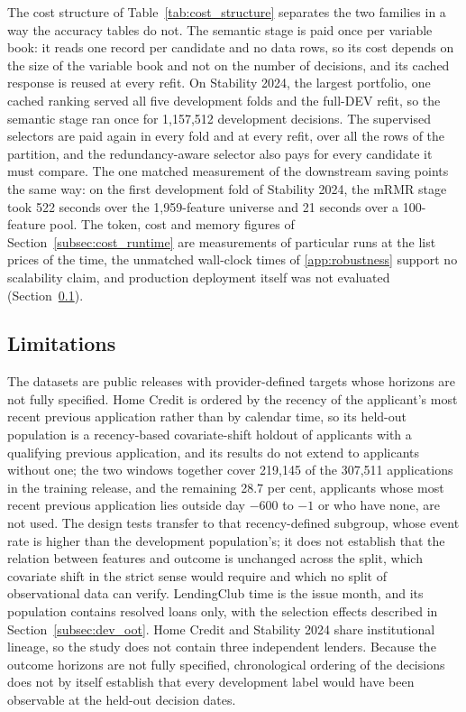 \documentclass[final,5p,twocolumn]{elsarticle}
\providecommand{\DIFaddtex}[1]{{\protect\color{blue} \sf #1}} %
\providecommand{\DIFaddend}{} %
\providecommand{\DIFadd}[1]{\texorpdfstring{\DIFaddtex{#1}}{#1}} %
\begin{document}
\DIFadd{The cost structure of Table~\ref{tab:cost_structure} separates the two families in a way the accuracy tables do not. The semantic stage is paid once per variable book: it reads one record per candidate and no data rows, so its cost depends on the size of the variable book and not on the number of decisions, and its cached response is reused at every refit. On Stability 2024, the largest portfolio, one cached ranking served all five development folds and the full-DEV refit, so the semantic stage ran once for 1,157,512 development decisions. The supervised selectors are paid again in every fold and at every refit, over all the rows of the partition, and the redundancy-aware selector also pays for every candidate it must compare. The one matched measurement of the downstream saving points the same way: on the first development fold of Stability 2024, the mRMR stage took 522 seconds over the 1,959-feature universe and 21 seconds over a 100-feature pool. The token, cost and memory figures of Section~\ref{subsec:cost_runtime} are measurements of particular runs at the list prices of the time, the unmatched wall-clock times of \ref{app:robustness} support no scalability claim, and production deployment itself was not evaluated (Section~\ref{subsec:limitations}).
}

\DIFaddend \subsection{Limitations}
\label{subsec:limitations}

The datasets are public releases with provider-defined targets whose horizons are not fully specified. Home Credit is ordered by the recency of the applicant's most recent previous application rather than by calendar time, so its held-out population is a recency-based covariate-shift holdout of applicants with a qualifying previous application, and its results do not extend to applicants without one; the two windows together cover 219,145 of the 307,511 applications in the training release, and the remaining 28.7 per cent, applicants whose most recent previous application lies outside day $-600$ to $-1$ or who have none, are not used. The design tests transfer to that recency-defined subgroup, whose event rate is higher than the development population's; it does not establish that the relation between features and outcome is unchanged across the split, which covariate shift in the strict sense would require and which no split of observational data can verify. LendingClub time is the issue month, and its population contains resolved loans only, with the selection effects described in Section~\ref{subsec:dev_oot}. Home Credit and Stability 2024 share institutional lineage, so the study does not contain three independent lenders. Because the outcome horizons are not fully specified, chronological ordering of the decisions does not by itself establish that every development label would have been observable at the held-out decision dates.
\end{document}
